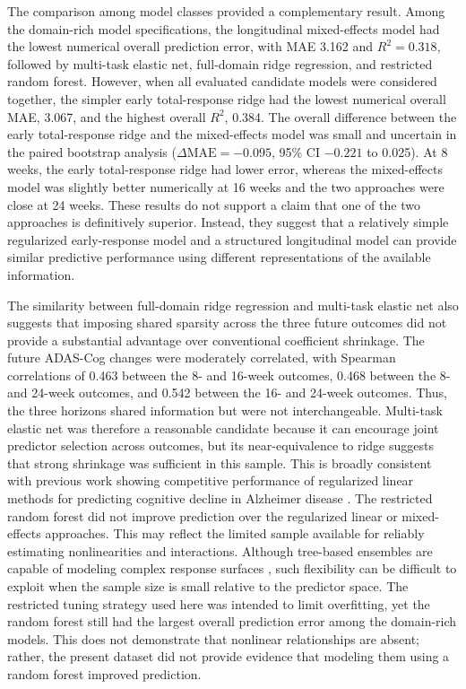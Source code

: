 \documentclass[11pt]{article}
\begin{document}
The comparison among model classes provided a complementary result. Among the domain-rich model specifications, the longitudinal mixed-effects model had the lowest numerical overall prediction error, with MAE 3.162 and $R^2=0.318$, followed by multi-task elastic net, full-domain ridge regression, and restricted random forest. However, when all evaluated candidate models were considered together, the simpler early total-response ridge had the lowest numerical overall MAE, 3.067, and the highest overall $R^2$, 0.384. The overall difference between the early total-response ridge and the mixed-effects model was small and uncertain in the paired bootstrap analysis ($\Delta\mathrm{MAE}=-0.095$, 95\% CI $-0.221$ to 0.025). At 8 weeks, the early total-response ridge had lower error, whereas the mixed-effects model was slightly better numerically at 16 weeks and the two approaches were close at 24 weeks. These results do not support a claim that one of the two approaches is definitively superior. Instead, they suggest that a relatively simple regularized early-response model and a structured longitudinal model can provide similar predictive performance using different representations of the available information.

The similarity between full-domain ridge regression and multi-task elastic net also suggests that imposing shared sparsity across the three future outcomes did not provide a substantial advantage over conventional coefficient shrinkage. The future ADAS-Cog changes were moderately correlated, with Spearman correlations of 0.463 between the 8- and 16-week outcomes, 0.468 between the 8- and 24-week outcomes, and 0.542 between the 16- and 24-week outcomes. Thus, the three horizons shared information but were not interchangeable. Multi-task elastic net was therefore a reasonable candidate because it can encourage joint predictor selection across outcomes, but its near-equivalence to ridge suggests that strong shrinkage was sufficient in this sample. This is broadly consistent with previous work showing competitive performance of regularized linear methods for predicting cognitive decline in Alzheimer disease \citep{imani2021comparison,zou2005elasticnet}. The restricted random forest did not improve prediction over the regularized linear or mixed-effects approaches. This may reflect the limited sample available for reliably estimating nonlinearities and interactions. Although tree-based ensembles are capable of modeling complex response surfaces \citep{breiman2001random}, such flexibility can be difficult to exploit when the sample size is small relative to the predictor space. The restricted tuning strategy used here was intended to limit overfitting, yet the random forest still had the largest overall prediction error among the domain-rich models. This does not demonstrate that nonlinear relationships are absent; rather, the present dataset did not provide evidence that modeling them using a random forest improved prediction.
\end{document}
